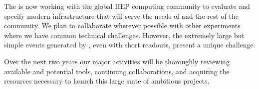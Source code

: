 The  is now working with the global HEP computing community to evaluate and specify modern infrastructure that will serve the needs of  and the rest of the community.  We plan to collaborate wherever possible with other experiments where we have common technical challenges. However, the extremely large but simple events generated by  , even with short readouts, present a unique challenge. 

Over the next two years our major activities  will be  thoroughly reviewing available and potential tools, continuing collaborations, and acquiring the resources necessary to launch this large suite of ambitious projects. 
